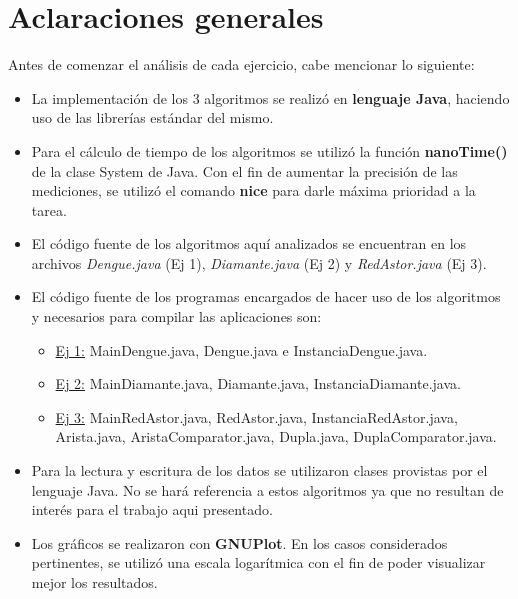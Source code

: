 \documentclass[a4paper,11pt] {article}
\begin{document}
\grupo{}

\maketitle

\bigskip
\section*{Aclaraciones generales}

Antes de comenzar el an\'alisis de cada ejercicio, cabe mencionar lo siguiente:

\begin{itemize}
 \item La implementaci\'on de los 3 algoritmos se realiz\'o en \textbf{lenguaje Java}, haciendo uso de las librer\'ias est\'andar del mismo.
 \item Para el c\'alculo de tiempo de los algoritmos se utiliz\'o la funci\'on \textbf{nanoTime()} de la clase System de Java. Con el fin de aumentar la precisi\'on de las mediciones, se utiliz\'o el comando \textbf{nice} para darle m\'axima prioridad a la tarea.
 \item El c\'odigo fuente de los algoritmos aqu\'i analizados se encuentran en los archivos \textit{Dengue.java} (Ej 1), \textit{Diamante.java} (Ej 2) y \textit{RedAstor.java} (Ej 3).
 \item El c\'odigo fuente de los programas encargados de hacer uso de los algoritmos y necesarios para compilar las aplicaciones son:
 \begin{itemize}
    \item \underline{Ej 1:} MainDengue.java, Dengue.java e InstanciaDengue.java.
    \item \underline{Ej 2:} MainDiamante.java, Diamante.java, InstanciaDiamante.java.
    \item \underline{Ej 3:} MainRedAstor.java, RedAstor.java, InstanciaRedAstor.java, Arista.java, AristaComparator.java, Dupla.java, DuplaComparator.java.
  \end{itemize}
 \item Para la lectura y escritura de los datos se utilizaron clases provistas por el lenguaje Java. No se har\'a referencia a estos algoritmos ya que no resultan de inter\'es para el trabajo aqui presentado.
 \item Los gr\'aficos se realizaron con \textbf{GNUPlot}. En los casos considerados pertinentes, se utiliz\'o una escala logar\'itmica con el fin de poder visualizar mejor los resultados.
\end{itemize}
\end{document}
